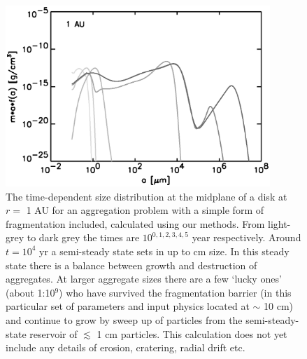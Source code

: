 \begin{figure}[t]
\centerline{\includegraphics[width=10cm]{c2fig1.eps}}
\caption{\label{fig-lucky}The time-dependent size distribution at the 
midplane of a disk at $r=$ 1 AU for an aggregation problem with a simple
form of fragmentation included, calculated using our methods. From
light-grey to dark grey the times are $10^{0,1,2,3,4,5}$ year respectively.
Around $t=10^4$ yr a semi-steady state sets in up to cm size. In this steady
state there is a balance between growth and destruction of aggregates. At
larger aggregate sizes there are a few `lucky ones' (about 1:10$^9$) who
have survived the fragmentation barrier (in this particular set of
parameters and input physics located at $\sim$ 10 cm) and continue to grow
by sweep up of particles from the semi-steady-state reservoir of $\lesssim$
1 cm particles. This calculation does not yet include any details of
erosion, cratering, radial drift etc.}
\end{figure}



